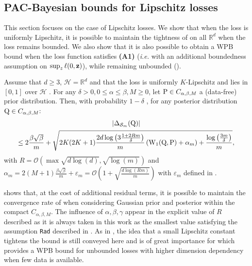 \subsection{PAC-Bayesian bounds for Lipschitz losses}
\label{sec: main_sec_gaussian_lpz}

This section focuses on the case of Lipschitz losses. We show that when the loss is uniformly Lipschitz, it is possible to maintain the tightness of  on all $\mathbb{R}^d$ when the loss remains bounded. We also show that it is also possible to obtain a WPB bound when the loss function satisfies \textbf{(A1)} (\emph{i.e.} with an additional boundedness assumption on $\sup_{z} \ell(0,\z)$), while remaining unbounded ().

\begin{theorem}
\label{th: main_gaussian_lpz}
Assume that $d\geq 3$, $\mathcal{H}= \mathbb{R}^d$ and that the loss is uniformly $K$-Lipschitz and lies in $[0,1]$ over $\mathcal{H}$ . For any $\delta>0, 0\leq \alpha\leq \beta, M\geq 0$, let $\P\in C_{\alpha,\beta,M}$ a (data-free) prior distribution.
Then, with probability $1-\delta$ , for any posterior distribution $\Q\in C_{\alpha,\beta,M}$:
\begin{multline*}
|\Delta_{\Sm}(\Q)|  \\ 
\leq  2\frac{\beta{\sqrt{\beta}}}{m} + \sqrt{2K(2K+1)\frac{2d\log\left(3\frac{1 +2Rm }{\delta}\right)}{m} \left(\W_{1}(\Q,\P)+\alpha_m \right) + \frac{\log\left( \frac{3m}{\delta} \right)}{m}  },
\end{multline*}
with $R=\mathcal{O}(\max \sqrt{d\log(d)},\sqrt{\log(m)})$ and $\alpha_m= 2(M+1)\frac{\beta\sqrt{\beta}}{m} + \varepsilon_m= \mathcal{O}\left(1 + \sqrt{\frac{d\log(Rm)}{m}}\right)$ with $\varepsilon_m$ defined in .
\end{theorem}
 shows that, at the cost of additional residual terms, it is possible to maintain the convergence rate of  when considering Gaussian prior and posterior within the compact $C_{\alpha,\beta,M}$. The influence of $\alpha,\beta,\gamma$ appear in the explicit value of $R$ described as it is always taken in this work as the smallest value satisfying the assumption \texttt{Rad} described in .
As in , the idea that a small Lipschitz constant tightens the bound is still conveyed here and is of great importance for  which provides a WPB bound for unbounded losses with higher dimension dependency when few data is available.
